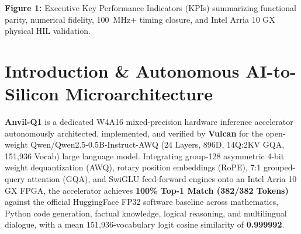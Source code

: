 \documentclass[11pt,a4paper]{article}
\begin{document}
\begin{center}
\begin{minipage}{\textwidth}
\par\vspace{3pt}

{\small\textbf{Figure 1:} Executive Key Performance Indicators (KPIs) summarizing functional parity, numerical fidelity, 100~MHz+ timing closure, and Intel Arria 10 GX physical HIL validation.}\end{minipage}\end{center}

\section{Introduction \& Autonomous AI-to-Silicon Microarchitecture}

\textbf{Anvil-Q1} is a dedicated W4A16 mixed-precision hardware inference accelerator autonomously architected, implemented, and verified by \textbf{Vulcan} for the open-weight Qwen/\allowbreak{}Qwen2.5-0.5B-Instruct-AWQ (\allowbreak{}24 Layers,\allowbreak{} 896D,\allowbreak{} 14Q:2KV GQA,\allowbreak{} 151,\allowbreak{}936 Vocab)\allowbreak{} large language model. Integrating group-128 asymmetric 4-bit weight dequantization (AWQ), rotary position embeddings (RoPE), 7:1 grouped-query attention (GQA), and SwiGLU feed-forward engines onto an Intel Arria 10 GX FPGA, the accelerator achieves \textbf{100\% Top-1 Match (\allowbreak{}382/\allowbreak{}382 Tokens)\allowbreak{}} against the official HuggingFace FP32 software baseline across mathematics, Python code generation, factual knowledge, logical reasoning, and multilingual dialogue, with a mean 151,936-vocabulary logit cosine similarity of \textbf{0.999992}.

\vspace{2pt}
\end{document}
